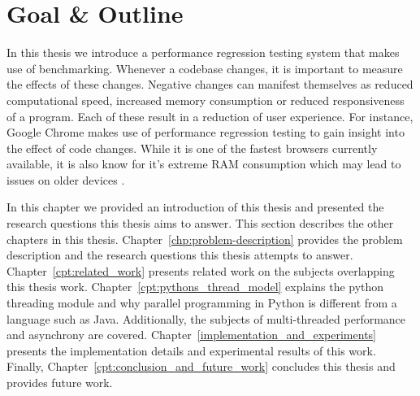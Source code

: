 \section{Goal \& Outline}
In this thesis we introduce a performance regression testing system that makes use of benchmarking.
Whenever a codebase changes, it is important to measure the effects of these changes.
Negative changes can manifest themselves as reduced computational speed, increased memory consumption or reduced responsiveness of a program.
Each of these result in a reduction of user experience.
For instance, Google Chrome makes use of performance regression testing to gain insight into the effect of code changes.
While it is one of the fastest browsers currently available, it is also know for it's extreme RAM consumption which may lead to issues on older devices \cite{ram2012chrome}.

In this chapter we provided an introduction of this thesis and presented the research questions this thesis aims to answer. 
This section describes the other chapters in this thesis.
Chapter~\ref{chp:problem-description} provides the problem description and the research questions this thesis attempts to answer.
Chapter~\ref{cpt:related_work} presents related work on the subjects overlapping this thesis work.
Chapter~\ref{cpt:pythons_thread_model} explains the python threading module and why parallel programming in Python is different from a language such as Java. Additionally, the subjects of multi-threaded performance and asynchrony are covered.
Chapter~\ref{implementation_and_experiments} presents the implementation details and experimental results of this work.
Finally, Chapter~\ref{cpt:conclusion_and_future_work} concludes this thesis and provides future work.
